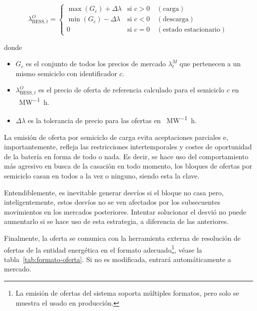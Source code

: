   \begin{samepage}

    \begin{equation}
      \lambda^{O}_{\text{BESS}, t} =
      \begin{cases}
        \max(G_{c}) + \Delta \lambda & \text{si } c > 0 \quad (\text{carga})\\
        \min(G_{c}) - \Delta \lambda & \text{si } c < 0 \quad (\text{descarga})\\
        0                            & \text{si } c = 0 \quad (\text{estado estacionario})
      \end{cases}
    \end{equation}

    donde

    \begin{itemize}

      \item \( G_{c} \) es el conjunto de todos los precios de mercado \( \lambda^{M}_{t} \) que pertenecen a un mismo semiciclo con identificador \( c \).

      \item \( \lambda^{O}_{\text{BESS}, t} \) es el precio de oferta de referencia calculado para el semiciclo \( c \) en \si{\text{\euro}\per\mega\watt\hour}.

      \item \( \Delta \lambda \) es la tolerancia de precio para las ofertas en \si{\text{\euro}\per\mega\watt\hour}.

    \end{itemize}

  \end{samepage}

  La emisión de oferta por semiciclo de carga evita aceptaciones parciales e, importantemente, refleja las restricciones intertemporales y costes de oportunidad de la batería en forma de todo o nada. Es decir, se hace uso del comportamiento más agresivo en busca de la casación en todo momento, los bloques de ofertas por semiciclo casan en todos a la vez o ninguno, siendo esta la clave.

  Entendiblemente, es inevitable generar desvíos si el bloque no casa pero, inteligentemente, estos desvíos no se ven afectados por los subsecuentes movimientos en los mercados posteriores. Intentar solucionar el desvió no puede aumentarlo si se hace uso de esta estrategia, a diferencia de las anteriores.

  Finalmente, la oferta se comunica con la herramienta externa de resolución de ofertas de la entidad energética en el formato adecuado\footnote{La emisión de ofertas del sistema soporta múltiples formatos, pero solo se muestra el usado en producción.}, véase la tabla~\ref{tab:formato-oferta}. Si no es modificada, entrará automáticamente a mercado.

